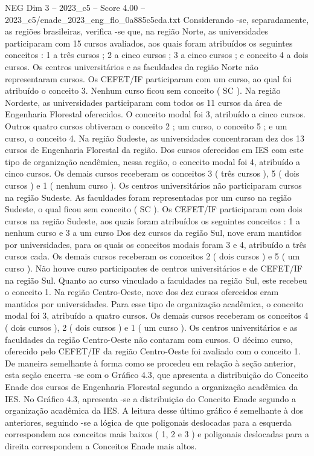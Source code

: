 \begin{textsample}{NEG Dim 3 – 2023\_c5 – Score 4.00 – 2023\_c5/enade\_2023\_eng\_flo\_0a885c5cda.txt}
Considerando -se, separadamente, as regiões brasileiras, verifica -se que, na região Norte, as universidades participaram com 15 cursos avaliados, aos quais foram atribuídos os seguintes conceitos : 1 a três cursos ; 2 a cinco cursos ; 3 a cinco cursos ; e conceito 4 a dois cursos.
Os centros universitários e as faculdades da região Norte não representaram cursos.
Os CEFET/IF participaram com um curso, ao qual foi atribuído o conceito 3.
Nenhum curso ficou sem conceito ( SC ).
Na região Nordeste, as universidades participaram com todos os 11 cursos da área de Engenharia Florestal oferecidos.
O conceito modal foi 3, atribuído a cinco cursos.
Outros quatro cursos obtiveram o conceito 2 ; um curso, o conceito 5 ; e um curso, o conceito 4.
Na região Sudeste, as universidades concentraram dez dos 13 cursos de Engenharia Florestal da região.
Dos cursos oferecidos em IES com este tipo de organização acadêmica, nessa região, o conceito modal foi 4, atribuído a cinco cursos.
Os demais cursos receberam os conceitos 3 ( três cursos ), 5 ( dois cursos ) e 1 ( nenhum curso ).
Os centros universitários não participaram cursos na região Sudeste.
As faculdades foram representadas por um curso na região Sudeste, o qual ficou sem conceito ( SC ).
Os CEFET/IF participaram com dois cursos na região Sudeste, aos quais foram atribuídos os seguintes conceitos : 1 a nenhum curso e 3 a um curso Dos dez cursos da região Sul, nove eram mantidos por universidades, para os quais os conceitos modais foram 3 e 4, atribuído a três cursos cada.
Os demais cursos receberam os conceitos 2 ( dois cursos ) e 5 ( um curso ).
Não houve curso participantes de centros universitários e de CEFET/IF na região Sul.
Quanto ao curso vinculado a faculdades na região Sul, este recebeu o conceito 1.
Na região Centro-Oeste, nove dos dez cursos oferecidos eram mantidos por universidades.
Para esse tipo de organização acadêmica, o conceito modal foi 3, atribuído a quatro cursos.
Os demais cursos receberam os conceitos 4 ( dois cursos ), 2 ( dois cursos ) e 1 ( um curso ).
Os centros universitários e as faculdades da região Centro-Oeste não contaram com cursos.
O décimo curso, oferecido pelo CEFET/IF da região Centro-Oeste foi avaliado com o conceito 1.
De maneira semelhante à forma como se procedeu em relação à seção anterior, esta seção encerra -se com o Gráfico 4.3, que apresenta a distribuição do Conceito Enade dos cursos de Engenharia Florestal segundo a organização acadêmica da IES.
No Gráfico 4.3, apresenta -se a distribuição do Conceito Enade segundo a organização acadêmica da IES.
A leitura desse último gráfico é semelhante à dos anteriores, seguindo -se a lógica de que poligonais deslocadas para a esquerda correspondem aos conceitos mais baixos ( 1, 2 e 3 ) e poligonais deslocadas para a direita correspondem a Conceitos Enade mais altos.

\end{textsample}
